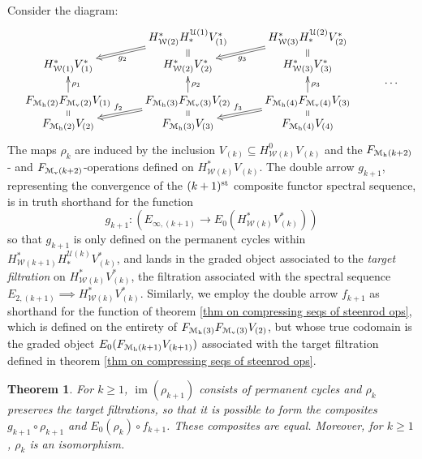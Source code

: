 \documentclass[11pt]{amsart}
\theoremstyle{plain}
\newtheorem{thm}{Theorem}[section]
\theoremstyle{definition}
\DeclareMathOperator{\im}{im}
\renewcommand{\to}{\longrightarrow}
\newcommand{\calW}{\mathcal{W}}
\newcommand{\calU}{\mathcal{U}}
\newcommand{\calM}{\mathcal{M}}
\theoremstyle{plain}
\begin{document}
\begin{Calculations of HWn for n nonzero}
Consider the diagram:
\[\xymatrix@R=1.5mm{
&
H^*_{\calW(2)}H_*^{\calU(1)}V^*_{(1)}\ar@{=>}[dl]^-{g_2}\ar@{=}[d]&
H^*_{\calW(3)}H_*^{\calU(2)}V^*_{(2)}\ar@{=>}[dl]^-{g_3}\ar@{=}[d]&
\\
 H_{\calW(1)}^{*}V^{*}_{(1)}
&H_{\calW(2)}^{*}V^{*}_{(2)}
&H_{\calW(3)}^{*}V^{*}_{(3)}
\\
&&&\smash{\cdots }
\\
 F_{\calM_{\textup{h}}(2)}F_{\calM_{\textup{v}}(2)}V_{(1)}\ar[uu]_-{\rho_1}\ar@{=}[d]
&F_{\calM_{\textup{h}}(3)}F_{\calM_{\textup{v}}(3)}V_{(2)}\ar[uu]_-{\rho_2}\ar@{=}[d]\ar@{=>}[ld]_-{f_2}
&F_{\calM_{\textup{h}}(4)}F_{\calM_{\textup{v}}(4)}V_{(3)}\ar[uu]_-{\rho_3}\ar@{=}[d]\ar@{=>}[ld]_-{f_3}
\\
 F_{\calM_\textup{h}(2)}V_{(2)}
&F_{\calM_\textup{h}(3)}V_{(3)}
&F_{\calM_\textup{h}(4)}V_{(4)}
}\]
The maps $\rho_k$ are induced by the inclusion $V_{(k)}\subseteq H^{0}_{\calW(k)}V_{(k)}$ and the $F_{\calM_\textup{h}(k+2)}$- and $F_{\calM_\textup{v}(k+2)}$-operations defined on $H^{*}_{\calW(k)}V_{(k)}$. The double arrow $g_{k+1}$, representing the convergence of the $(k+1)^{\textup{st}}$ composite functor spectral sequence, is in truth shorthand for the function
\[g_{k+1}:\left(E_{\infty,(k+1)}\to E_0(H_{\calW(k)}^{*}V^{*}_{(k)})\right)\]
so that $g_{k+1}$ is only defined on the permanent cycles within $H^*_{\calW(k+1)}H_*^{\calU(k)}V^*_{(k)}$, and lands in the graded object associated to the \emph{target filtration} on $H_{\calW(k)}^{*}V^{*}_{(k)}$, the filtration associated with the spectral sequence $E_{2,(k+1)}\implies H_{\calW(k)}^{*}V^{*}_{(k)}$. Similarly, we employ the double arrow $f_{k+1}$ as shorthand for the function of theorem \ref{thm on compressing seqs of steenrod ops}, which is defined on the entirety of $F_{\calM_{\textup{h}}(3)}F_{\calM_{\textup{v}}(3)}V_{(2)}$, but whose true codomain is the graded object $E_0(F_{\calM_\textup{h}(k+1)}V_{(k+1)})$ associated with the target filtration defined in theorem \ref{thm on compressing seqs of steenrod ops}.
\begin{thm}
For $k\geq 1$, $\im(\rho_{k+1})$ consists of permanent cycles and $\rho_k$ preserves the target filtrations, so that it is possible to form the composites $g_{k+1}\circ \rho_{k+1}$ and $E_0(\rho_{k})\circ f_{k+1}$. These composites are equal. Moreover, for $k\geq 1$, $\rho_k$ is an isomorphism.

\end{thm}
\end{Calculations of HWn for n nonzero}
\end{document}
